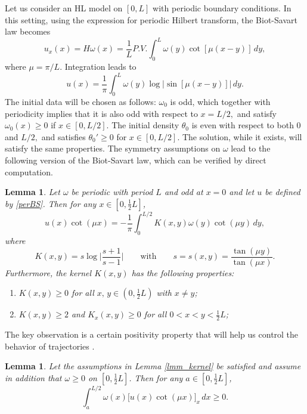 \documentclass[reqno,centertags, 11pt]{amsart}
\newtheorem{lemma}[theorem]{Lemma}
\newcommand{\be}{\mathbf e} \newcommand{\bh}{\mathbf h}
\newcommand{\lb}{\label}
\renewcommand{\be}{\begin{equation}}
\newcommand{\ee}{\end{equation}}
\begin{document}
Let us consider an HL model on $[0,L]$ with periodic boundary conditions. In this setting, using the expression for periodic Hilbert transform,
the Biot-Savart law becomes
\[ u_x(x) = H \omega(x) = \frac1L P.V. \int_0^L \omega(y) \cot[\mu (x-y)]\,dy, \]
where $\mu = \pi/L.$ Integration leads to
\be\lb{perBS}
u(x) = \frac{1}{\pi} \int_0^L \omega(y) \log|\sin[\mu(x-y)]|\,dy.
\ee
The initial data will be chosen as follows: $\omega_0$ is odd, which together with periodicity implies that it is also
odd with respect to $x=L/2,$ and satisfy $\omega_0(x) \geq 0$ if $x \in [0,L/2].$ The initial density $\theta_0$ is even
with respect to both $0$ and $L/2,$ and satisfies $\theta_0' \geq 0$ for $x \in [0,L/2].$ The solution, while it exists, will satisfy
the same properties. The symmetry assumptions on $\omega$ lead to the following version of the Biot-Savart law, which can be verified
by direct computation.
\begin{lemma}\label{l3a}
Let $\omega$ be periodic with period $L$ and odd at $x = 0$ and let $u$ be defined by \eqref{perBS}. Then for any $x \in [0,\frac{1}{2} L]$,
\begin{equation}
  u(x) \cot(\mu x) = -\frac{1}{\pi} \int_{0}^{L/2} K(x,y) \omega(y) \cot(\mu y)\,dy,
  \label{eqn_u_ker}
\end{equation}
where
\begin{equation}
  K(x,y) = s \log \biggl| \frac{s+1}{s-1} \biggr|\qquad \text{with}\qquad s = s(x,y) = \frac{\tan(\mu y)}{\tan(\mu x)}.
  \label{eqn_K}
\end{equation}
Furthermore, the kernel $K(x,y)$ has the following properties:
\begin{enumerate}
  \item $K(x,y) \geq 0$ for all $x,\, y \in (0,\frac{1}{2} L)$ with $x \neq y$;
  \vspace{1mm}
  \item $K(x,y) \geq 2$ and $K_{x}(x,y) \geq 0$ for all $0 < x < y < \frac{1}{2} L$;
\end{enumerate}
\label{lmm_kernel}
\end{lemma}
The key observation is a certain positivity property that will help us control the behavior of trajectories \cite{CHKLSY}.
\begin{lemma}\label{l4}
Let the assumptions in Lemma \ref{lmm_kernel} be satisfied and assume in addition that $\omega \geq 0$ on $[0,\frac{1}{2} L]$. Then for any $a \in [0,\frac{1}{2} L]$,
\begin{equation}
  \int_{a}^{L/2} \omega(x) \bigl[ u(x) \cot(\mu x) \bigr]_{x}\,dx \geq 0.
  \label{eqn_wvy_pos}
\end{equation}
\label{lmm_wvy_pos}
\end{lemma}
\end{document}
